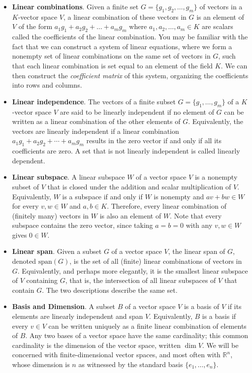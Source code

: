\documentclass{article}
\begin{document}
\begin{itemize}
    \item \textbf{Linear combinations}. Given a finite set $G=\{g_1, g_2, \dots, g_m\}$ of vectors in a $K$-vector space $V$, a linear combination of these vectors in $G$ is an element of $V$ of the form $a_1g_1+a_2g_2+\dots+a_mg_m$ where $a_1,a_2,\dots,a_m \in K$ are scalars called the coefficients of the linear combination. You may be familiar with the fact that we can construct a system of linear equations, where we form a nonempty set of linear combinations on the same set of vectors in $G$, such that each linear combination is set equal to an element of the field $K$. We can then construct the \textit{coefficient matrix} of this system, organizing the coefficients into rows and columns.
    
    \item \textbf{Linear independence}. The vectors of a finite subset $G = \{g_1, \dots, g_m\}$ of a $K$-vector space $V$ are said to be linearly independent if no element of $G$ can be written as a linear combination of the other elements of $G$. Equivalently, the vectors are linearly independent if a linear combination $a_1 g_1 + a_2 g_2 + \cdots + a_m g_m$ results in the zero vector if and only if all its coefficients are zero. A set that is not linearly independent is called linearly dependent.
    
    \item \textbf{Linear subspace}. A linear subspace $W$ of a vector space $V$ is a nonempty subset of $V$ that is closed under the addition and scalar multiplication of $V$. Equivalently, $W$ is a subspace if and only if $W$ is nonempty and $av + bw \in W$ for every $v, w \in W$ and $a, b \in K$. Therefore, every linear combination of (finitely many) vectors in $W$ is also an element of $W$. Note that every subspace contains the zero vector, since taking $a = b = 0$ with any $v, w \in W$ gives $0 \in W$.
    
    \item \textbf{Linear span}. Given a subset $G$ of a vector space $V$, the linear span of $G$, denoted $\mathrm{span}(G)$, is the set of all (finite) linear combinations of vectors in $G$. Equivalently, and perhaps more elegantly, it is the smallest linear subspace of $V$ containing $G$, that is, the intersection of all linear subspaces of $V$ that contain $G$. The two descriptions describe the same set.
    
    \item \textbf{Basis and Dimension}. A subset $B$ of a vector space $V$ is a basis of $V$ if its elements are linearly independent and span $V$. Equivalently, $B$ is a basis if every $v \in V$ can be written uniquely as a finite linear combination of elements of $B$. Any two bases of a vector space have the same cardinality; this common cardinality is the dimension of the vector space, written $\dim V$. We will be concerned with finite-dimensional vector spaces, and most often with $\mathbb{R}^n$, whose dimension is $n$ as witnessed by the standard basis $\{e_1, \dots, e_n\}$.

\end{itemize}
\end{document}

